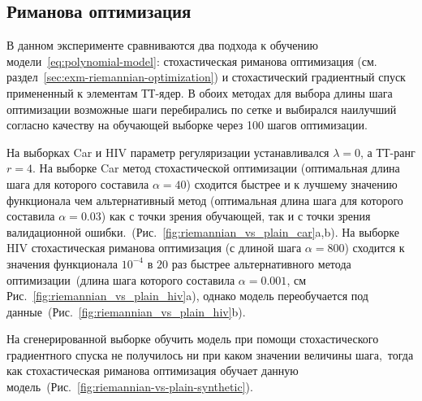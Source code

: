 \subsection{Риманова оптимизация \label{sec:exp-riemannian-optimization}}
В данном эксперименте сравниваются два подхода к обучению модели~\eqref{eq:polynomial-model}: стохастическая риманова оптимизация (см. раздел~\ref{sec:exm-riemannian-optimization}) и стохастический градиентный спуск примененный к элементам ТТ-ядер. В обоих методах для выбора длины шага оптимизации возможные шаги перебирались по сетке и выбирался наилучший согласно качеству на обучающей выборке через 100 шагов оптимизации.

На выборках Car и HIV параметр регуляризации устанавливался $\lambda = 0$, а ТТ-ранг $r = 4$.
На выборке Car метод стохастической оптимизации (оптимальная длина шага для которого составила $\alpha = 40$) сходится быстрее и к лучшему значению функционала чем альтернативный метод (оптимальная длина шага для которого составила $\alpha = 0.03$) как с точки зрения обучающей, так и с точки зрения валидационной ошибки.~(Рис.~\ref{fig:riemannian_vs_plain_car}a,b).
На выборке HIV стохастическая риманова оптимизация  (с длиной шага $\alpha = 800$) сходится к значения функционала $10^{-4}$ в $20$ раз быстрее альтернативного метода оптимизации~(длина шага которого составила $\alpha = 0.001$, см Рис.~\ref{fig:riemannian_vs_plain_hiv}a), однако модель переобучается под данные~(Рис.~\ref{fig:riemannian_vs_plain_hiv}b).

На сгенерированной выборке обучить модель при помощи стохастического градиентного спуска не получилось ни при каком значении величины шага, тогда как стохастическая риманова оптимизация обучает данную модель~(Рис.~\ref{fig:riemannian-vs-plain-synthetic}).

